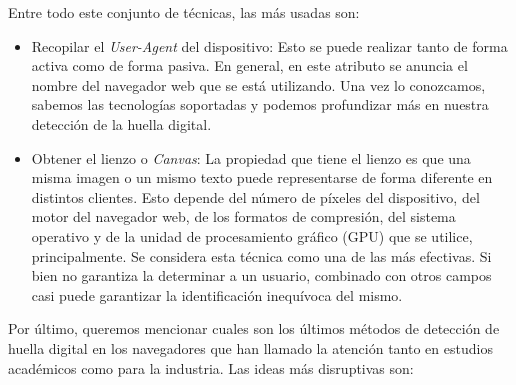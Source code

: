 Entre todo este conjunto de técnicas, las más usadas son: \par 

\begin{itemize}
	\item Recopilar el \textit{User-Agent} del dispositivo: Esto se puede realizar tanto de forma activa como de forma pasiva. En general, en este atributo se anuncia el nombre del navegador web que se está utilizando. Una vez lo conozcamos, sabemos las tecnologías soportadas y podemos profundizar más en nuestra detección de la huella digital. \par 
	
	\item Obtener el lienzo o \textit{Canvas}: La propiedad que tiene el lienzo es que una misma imagen o un mismo texto puede representarse de forma diferente en distintos clientes. Esto depende del número de píxeles del dispositivo, del motor del navegador web, de los formatos de compresión, del sistema operativo y de la unidad de procesamiento gráfico (GPU) que se utilice, principalmente. Se considera esta técnica como una de las más efectivas\cite{never_forget_paper}. Si bien no garantiza la determinar a un usuario, combinado con otros campos casi puede garantizar la identificación inequívoca del mismo. \par 
	
\end{itemize}

Por último, queremos mencionar cuales son los últimos métodos de detección de huella digital en los navegadores que han llamado la atención tanto en estudios académicos como para la industria. Las ideas más disruptivas son: \par

